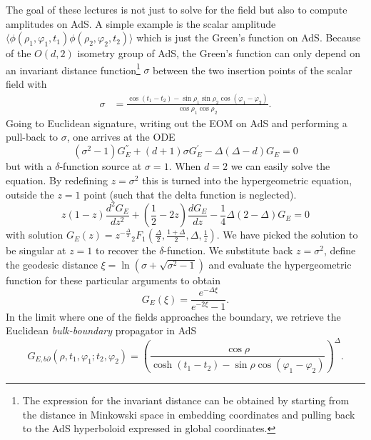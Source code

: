 \documentclass{PoS}
\newcommand{\LF}{\left(}
\newcommand{\RF}{\right)}
\begin{document}
The goal of these lectures is not just to solve for the field but also to compute amplitudes on AdS. A simple example is the scalar amplitude $\langle \phi(\rho_1,\varphi_1,t_1) \phi(\rho_2,\varphi_2,t_2)\rangle$ which is just the Green's function on AdS.  Because of the $O(d,2)$ isometry group of AdS, the Green's function can only depend on an invariant distance function\footnote{The expression for the invariant distance can be obtained by starting from the distance in Minkowski space in embedding coordinates and pulling back to the AdS hyperboloid expressed in global coordinates.}  $\sigma$ between the two insertion points of the scalar field with
\begin{align}
\sigma &= \frac{ \cos(t_1-t_2)-\sin\rho_1\sin\rho_2\cos(\varphi_1-\varphi_2)}{\cos\rho_1\cos\rho_2}.
\end{align}
Going to Euclidean signature, writing out the EOM on AdS and performing a pull-back to $\sigma$, one arrives at the ODE~\cite{Hamilton:2006az}
\begin{equation}
\LF \sigma^2 -1 \RF G_E^{''} + \LF d+1\RF \sigma G_E^{'} - \Delta \LF \Delta -d \RF G_E =0
\end{equation}
but with a $\delta$-function source at $\sigma=1$. When $d=2$ we can easily solve the equation. By redefining $z=\sigma^2$ this is turned into the hypergeometric equation, outside the $z=1$ point (such that the delta function is neglected).
\begin{equation}
z(1-z)\frac{d^2G_E}{dz^2} + \LF \frac{1}{2}-2z\RF \frac{dG_E}{dz} - \frac{1}{4}\Delta(2-\Delta)G_E = 0
\end{equation}
with solution $G_E(z) = z^{-\frac{\Delta}{2}}\left._2 F_1\right.\LF \frac{\Delta}{2},\frac{1+\Delta}{2},\Delta,\frac{1}{z}\RF$. We have picked the solution to be singular at $z=1$ to recover the $\delta$-function. We substitute back $z=\sigma^2$, define the geodesic distance $\xi = \ln \LF \sigma + \sqrt{\sigma^2-1}\RF$ and evaluate the hypergeometric function for these particular arguments to obtain
\begin{equation}
G_E(\xi) = \frac{e^{-\Delta \xi}}{e^{-2\xi}-1}.
\end{equation}
In the limit where one of the fields approaches the boundary, we retrieve the Euclidean \textit{bulk-boundary} propagator in AdS
\begin{equation}
G_{E,b\partial}\LF \rho,t_1,\varphi_1;t_2,\varphi_2\RF = \LF \frac{ \cos\rho}{\cosh(t_1-t_2) - \sin\rho \cos(\varphi_1-\varphi_2)}\RF^{\Delta}.\label{eq:bbprop}
\end{equation} 
\end{document}
